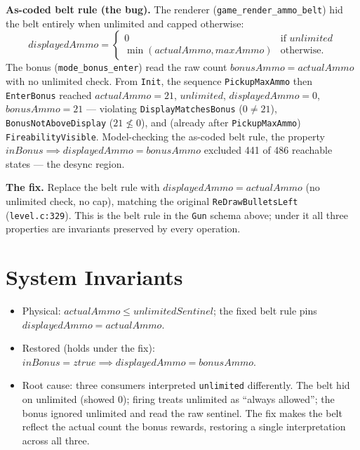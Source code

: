 \documentclass[a4paper,10pt,fleqn]{article}
\begin{document}
\textbf{As-coded belt rule (the bug).}  The renderer
(\texttt{game\_render\_ammo\_belt}) hid the belt entirely when unlimited
and capped otherwise:
\[
 displayedAmmo =
 \begin{cases}
   0 & \text{if } unlimited \\
   \min(actualAmmo, maxAmmo) & \text{otherwise.}
 \end{cases}
\]
The bonus (\texttt{mode\_bonus\_enter}) read the raw count
$bonusAmmo = actualAmmo$ with no unlimited check.  From \texttt{Init},
the sequence \texttt{PickupMaxAmmo} then \texttt{EnterBonus} reached
$actualAmmo = 21$, $unlimited$, $displayedAmmo = 0$, $bonusAmmo = 21$ ---
violating \texttt{DisplayMatchesBonus} ($0 \neq 21$),
\texttt{BonusNotAboveDisplay} ($21 \not\leq 0$), and (already after
\texttt{PickupMaxAmmo}) \texttt{FireabilityVisible}.  Model-checking the
as-coded belt rule, the property $inBonus \implies displayedAmmo =
bonusAmmo$ excluded 441 of 486 reachable states --- the desync region.

\textbf{The fix.}  Replace the belt rule with $displayedAmmo =
actualAmmo$ (no unlimited check, no cap), matching the original
\texttt{ReDrawBulletsLeft} (\texttt{level.c:329}).  This is the belt rule
in the \texttt{Gun} schema above; under it all three properties are
invariants preserved by every operation.

\section{System Invariants}

\begin{itemize}
\item Physical: $actualAmmo \leq unlimitedSentinel$; the fixed belt rule
      pins $displayedAmmo = actualAmmo$.
\item Restored (holds under the fix): $inBonus = ztrue \implies
      displayedAmmo = bonusAmmo$.
\item Root cause: three consumers interpreted \texttt{unlimited}
      differently.  The belt hid on unlimited (showed 0); firing treats
      unlimited as ``always allowed''; the bonus ignored unlimited and
      read the raw sentinel.  The fix makes the belt reflect the actual
      count the bonus rewards, restoring a single interpretation across
      all three.
\end{itemize}
\end{document}
